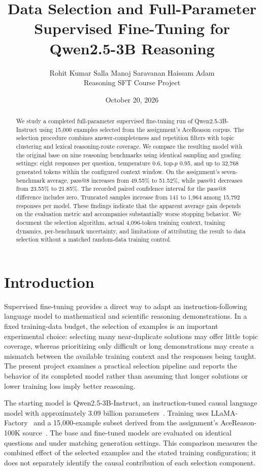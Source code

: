 \documentclass[11pt,letterpaper]{article}
\title{\vspace{-1.5em}\textbf{Data Selection and Full-Parameter Supervised Fine-Tuning for Qwen2.5-3B Reasoning}}
\author{Rohit Kumar Salla \quad Manoj Saravanan \quad Haissam Adam\\\small Reasoning SFT Course Project}
\date{October 20, 2026}
\begin{document}
\maketitle
\thispagestyle{fancy}
\begin{abstract}
We study a completed full-parameter supervised fine-tuning run of Qwen2.5-3B-Instruct using 15,000 examples selected from the assignment's AceReason corpus. The selection procedure combines answer-completeness and repetition filters with topic clustering and lexical reasoning-route coverage. We compare the resulting model with the original base on nine reasoning benchmarks using identical sampling and grading settings: eight responses per question, temperature 0.6, top-$p$ 0.95, and up to 32,768 generated tokens within the configured context window. On the assignment's seven-benchmark average, pass@8 increases from 49.55\% to 51.52\%, while pass@1 decreases from 23.55\% to 21.85\%. The recorded paired confidence interval for the pass@8 difference includes zero. Truncated samples increase from 141 to 1,964 among 15,792 responses per model. These findings indicate that the apparent average gain depends on the evaluation metric and accompanies substantially worse stopping behavior. We document the selection algorithm, actual 4,096-token training context, training dynamics, per-benchmark uncertainty, and limitations of attributing the result to data selection without a matched random-data training control.
\end{abstract}

\section{Introduction}
Supervised fine-tuning provides a direct way to adapt an instruction-following language model to mathematical and scientific reasoning demonstrations. In a fixed training-data budget, the selection of examples is an important experimental choice: selecting many near-duplicate solutions may offer little topic coverage, whereas prioritizing only difficult or long demonstrations may create a mismatch between the available training context and the responses being taught. The present project examines a practical selection pipeline and reports the behavior of its completed model rather than assuming that longer solutions or lower training loss imply better reasoning.

The starting model is Qwen2.5-3B-Instruct, an instruction-tuned causal language model with approximately 3.09 billion parameters~\cite{qwen}. Training uses LLaMA-Factory~\cite{llamafactory} and a 15,000-example subset derived from the assignment's AceReason-100K source~\cite{acereason,assignment}. The base and fine-tuned models are evaluated on identical questions and under matching generation settings. This comparison measures the combined effect of the selected examples and the stated training configuration; it does not separately identify the causal contribution of each selection component.
\end{document}
